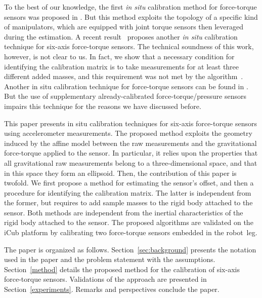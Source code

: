To the best of our knowledge, the first \emph{in situ} calibration method for force-torque sensors was proposed 
in \cite{shimanoroth}. But this method  exploits the topology of a specific kind of manipulators, which are equipped with
joint torque sensors then leveraged during the estimation. 
A recent result~\cite{Gong2013} proposes another \emph{in situ} calibration technique for six-axis force-torque sensors. 
The technical soundness of this work, however, is not clear to us. In fact, we show that a necessary condition for identifying the calibration matrix
is to take measurements for at least three different added masses, and this requirement was not met by the algorithm~\cite{Gong2013}.
Another in situ calibration technique for force-torque sensors can be found in \cite{roozbahani2013novel}.
But the use of supplementary already-calibrated force-torque/pressure sensors impairs this technique for the reasons we have discussed before. 




This paper presents in situ calibration techniques for six-axis force-torque sensors using accelerometer measurements.
The proposed method exploits the geometry induced by the affine model between the raw measurements and the gravitational force-torque applied to the sensor. 
In particular, it relies upon the properties that all gravitational raw measurements belong to a three-dimensional space, and that in this space they form an ellipsoid.
Then, the contribution of this paper is twofold. We first propose a method for estimating the sensor's offset, and then a procedure for identifying
the calibration matrix. The latter is independent from the former, but requires to add sample masses to the rigid body attached to the sensor. Both methods are independent from the inertial characteristics 
of the rigid body attached to the sensor. 
The proposed algorithms are validated on the iCub platform by calibrating
two force-torque sensors embedded in the robot~leg.

The paper is organized as follows. Section~\ref{sec:background} presents the notation used in the paper and the problem statement with the assumptions. 
Section~\ref{method} details the proposed method for the calibration of six-axis force-torque sensors. 
Validations of the approach are presented in Section~\ref{experiments}.
Remarks and perspectives conclude the paper.



